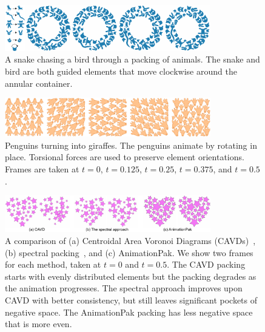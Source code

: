 \begin{figure}
\centering
\includegraphics[width=0.8\textwidth]{figures/animationpak/chasing_bird.pdf} 
\caption[An animated packing of a snake chases a bird]
{\label{fig_animationpak_chasing_bird} 
A snake chasing a bird through a packing of animals.  The snake and bird 
	are both guided elements that move clockwise around the annular 
	container.}
\end{figure}

\begin{figure}
\centering
\includegraphics[width=0.8\textwidth]{figures/animationpak/penguin_giraffe.pdf} 
\caption[An animated packing of the penguins-to-giraffes illusion]
{\label{fig_animationpak_penguin_giraffe} 
Penguins turning into giraffes.  The penguins animate by rotating in place.
Torsional forces are used to preserve element orientations.
Frames are taken at $t=0$, $t=0.125$, $t=0.25$, $t=0.375$, and $t=0.5$. 
}
\end{figure}

\begin{figure}
\centering
\includegraphics[width=0.8\textwidth]{figures/animationpak/star_comparison.pdf} 
\caption[An comparison between CAVD, The spectral approach, and AnimationPak]
{\label{fig_animationpak_star_comparison} 
A comparison of (a) Centroidal Area Voronoi Diagrams (CAVDs)~\cite{Smith2005}, 
(b) spectral packing~\cite{Dalal2006}, and (c) AnimationPak. 
We show two frames for each method, taken at $t = 0$ and $t = 0.5$. 
The CAVD packing starts with evenly distributed elements
but the packing degrades as the animation progresses.
The spectral approach improves upon CAVD with better consistency, 
but still leaves significant pockets of negative space.
The AnimationPak packing has less negative space that is more even.}
\end{figure}


